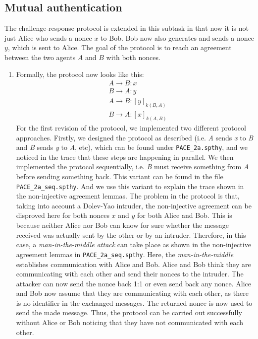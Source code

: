 \documentclass[a4paper,11pt]{scrartcl}
\begin{document}
\subsection{Mutual authentication}
The challenge-response protocol is extended in this subtask in that now it is not just Alice who sends a nonce $x$ to Bob.  Bob now also generates and sends a nonce $y$,  which is sent to Alice. The goal of the protocol is to reach an agreement between the two agents $A$ and $B$ with both nonces.
\begin{enumerate}[label=\alph*)]
	\item Formally, the protocol now looks like this:
\begin{align*}
&A \rightarrow B: x\\
&B \rightarrow A: y\\
&A \rightarrow B: [y]_{k(B,A)}\\
&B \rightarrow A: [x]_{k(A,B)}
\end{align*}
For the first revision of the protocol, we implemented two different protocol approaches. Firstly, we designed the protocol as described (i.e. \emph{A} sends \emph{x} to \emph{B} and \emph{B} sends \emph{y} to \emph{A}, etc), which can be found under \texttt{PACE\_2a.spthy}, and we noticed in the trace that these steps are happening in parallel. We then implemented the protocol sequentially, i.e. \emph{B} must receive something from \emph{A} before sending something back. This variant can be found in the file \texttt{PACE\_2a\_seq.spthy}. And we use this variant to explain the trace shown in the non-injective agreement lemmas.
 \newline
The problem in the protocol is that,  taking into account a Dolev-Yao intruder,  the non-injective agreement can be disproved here for both nonces $x$ and $y$ for both Alice and Bob. This is because neither Alice nor Bob can know for sure whether the message received was actually sent by the other or by an intruder.  Therefore, in this case,  a \textit{man-in-the-middle attack} can take place as shown in the non-injective agreement lemmas in \texttt{PACE\_2a\_seq.spthy}.  \newline
Here, the \textit{man-in-the-middle} establishes communication with Alice and Bob.  Alice and Bob think they are communicating with each other and send their nonces to the intruder. The attacker can now send the nonce back 1:1 or even send back any nonce.  Alice and Bob now assume that they are communicating with each other,  as there is no identifier in the exchanged messages.  The returned nonce is now used to send the made message.  Thus,  the protocol can be carried out successfully without Alice or Bob noticing that they have not communicated with each other.


\end{enumerate}
\end{document}
